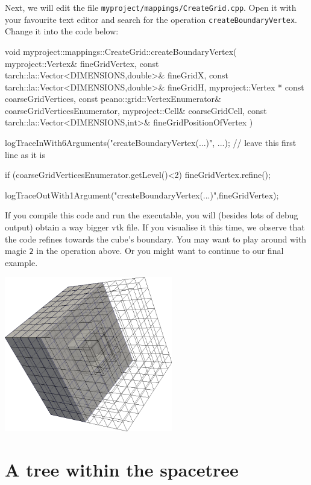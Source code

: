 Next, we will edit the file \texttt{myproject/mappings/CreateGrid.cpp}. 
Open it with your favourite text editor and search for the operation
\texttt{createBoundaryVertex}. 
Change it into the code below:


\begin{code}
void myproject::mappings::CreateGrid::createBoundaryVertex(
 myproject::Vertex&                          fineGridVertex,
 const tarch::la::Vector<DIMENSIONS,double>& fineGridX,
 const tarch::la::Vector<DIMENSIONS,double>& fineGridH,
 myproject::Vertex * const                   coarseGridVertices,
 const peano::grid::VertexEnumerator&     coarseGridVerticesEnumerator,
 myproject::Cell&                            coarseGridCell,
 const tarch::la::Vector<DIMENSIONS,int>&    fineGridPositionOfVertex
) {
  logTraceInWith6Arguments("createBoundaryVertex(...)", ...); 
    // leave this first line as it is
   
  if (coarseGridVerticesEnumerator.getLevel()<2) {
    fineGridVertex.refine();
  }

  logTraceOutWith1Argument("createBoundaryVertex(...)",fineGridVertex);
}
\end{code}


\noindent
If you compile this code and run the executable, you will (besides lots of
debug output) obtain a way bigger vtk file. 
If you visualise it this time, we observe that the code refines towards the
cube's boundary. 
You may want to play around with magic \texttt{2} in the operation above. 
Or you might want to continue to our final example.

\begin{center}
  \includegraphics[width=0.55\textwidth]{2_quickstart/cube.png}
\end{center}


\section{A tree within the spacetree}

